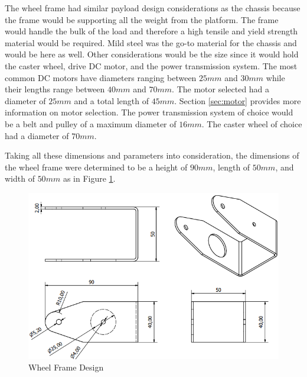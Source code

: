 The wheel frame had similar payload design considerations as the chassis because the frame would be supporting all the weight from the platform. The frame would handle the bulk of the load and therefore a high tensile and
yield strength material would be required. Mild steel was the go-to material for the chassis and would be here as well. Other considerations would be the size since it would hold the caster wheel, drive \ac{DC} motor, and the power transmission system. The most common \ac{DC} motors have diameters ranging between $25mm$ and $30mm$ while their lengths range between $40mm$ and $70mm$. The motor selected had a diameter of $25mm$ and a total length of $45mm$. Section \ref{sec:motor} provides more information on motor selection. The power transmission system of choice would be a belt and pulley of a maximum diameter of $16mm$. The caster wheel of choice had a diameter of $70mm$. 
\par
Taking all these dimensions and parameters into consideration, the dimensions of the wheel frame were determined to be a height of $90mm$, length of $50mm$, and width of $50mm$ as in Figure \ref{fig:newframe}.

\begin{figure}[H]
    \centering
    \includegraphics[scale = 0.8]{Figures/NewFrameDWG.png}
    \caption{Wheel Frame Design}
    \label{fig:newframe}
\end{figure}

